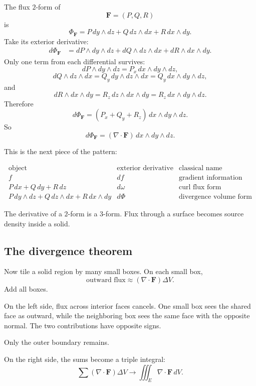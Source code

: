 The flux \(2\)-form of
\[
    \mathbf F=(P,Q,R)
\]
is
\[
    \Phi_{\mathbf F}
    =
    P\,dy\wedge dz
    +
    Q\,dz\wedge dx
    +
    R\,dx\wedge dy.
\]
Take its exterior derivative:
\[
\begin{aligned}
d\Phi_{\mathbf F}
&=
dP\wedge dy\wedge dz
+
dQ\wedge dz\wedge dx
+
dR\wedge dx\wedge dy.
\end{aligned}
\]
Only one term from each differential survives:
\[
    dP\wedge dy\wedge dz
    =
    P_x\,dx\wedge dy\wedge dz,
\]
\[
    dQ\wedge dz\wedge dx
    =
    Q_y\,dy\wedge dz\wedge dx
    =
    Q_y\,dx\wedge dy\wedge dz,
\]
and
\[
    dR\wedge dx\wedge dy
    =
    R_z\,dz\wedge dx\wedge dy
    =
    R_z\,dx\wedge dy\wedge dz.
\]
Therefore
\[
\boxed{
    d\Phi_{\mathbf F}
    =
    (P_x+Q_y+R_z)\,dx\wedge dy\wedge dz.
}
\]
So
\[
\boxed{
    d\Phi_{\mathbf F}
    =
    (\nabla\cdot\mathbf F)\,dx\wedge dy\wedge dz.
}
\]

This is the next piece of the pattern:

\[
\begin{array}{c|c|c}
\text{object} & \text{exterior derivative} & \text{classical name}\\ \hline
f & df & \text{gradient information}\\[1mm]
P\,dx+Q\,dy+R\,dz & d\omega & \text{curl flux form}\\[1mm]
P\,dy\wedge dz+Q\,dz\wedge dx+R\,dx\wedge dy & d\Phi & \text{divergence volume form}
\end{array}
\]

The derivative of a \(2\)-form is a \(3\)-form.  Flux through a surface becomes source
density inside a solid.

\subsection{The divergence theorem}

Now tile a solid region by many small boxes.  On each small box,
\[
    \text{outward flux}
    \approx
    (\nabla\cdot\mathbf F)\Delta V.
\]
Add all boxes.

On the left side, flux across interior faces cancels.  One small box sees the shared face
as outward, while the neighboring box sees the same face with the opposite normal.
The two contributions have opposite signs.

Only the outer boundary remains.

On the right side, the sums become a triple integral:
\[
    \sum(\nabla\cdot\mathbf F)\Delta V
    \longrightarrow
    \iiint_E \nabla\cdot\mathbf F\,dV.
\]

